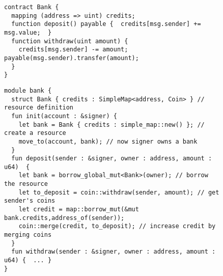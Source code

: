 \begin{figure}[t]
\small
\begin{lstlisting}[language=solidity,caption={Simplified Solidity code for the Bank case study},label={fig:codeSol}]
contract Bank { 
  mapping (address => uint) credits;
  function deposit() payable {  credits[msg.sender] += msg.value;  }
  function withdraw(uint amount) {
    credits[msg.sender] -= amount; payable(msg.sender).transfer(amount);
  }
}
\end{lstlisting}
\end{figure}

\begin{figure}[t]
\begin{lstlisting}[language=move,caption={Simplified Move code for the Bank case study},label={fig:codeMove}]
module bank {
  struct Bank { credits : SimpleMap<address, Coin> } //  resource definition 
  fun init(account : &signer) {
    let bank = Bank { credits : simple_map::new() }; // create a resource 
    move_to(account, bank); // now signer owns a bank
  }
  fun deposit(sender : &signer, owner : address, amount : u64)  {
    let bank = borrow_global_mut<Bank>(owner); // borrow the resource        
    let to_deposit = coin::withdraw(sender, amount); // get sender's coins
    let credit = map::borrow_mut(&mut bank.credits,address_of(sender)); 
    coin::merge(credit, to_deposit); // increase credit by merging coins   
  }
  fun withdraw(sender : &signer, owner : address, amount : u64) {  ... }
}
\end{lstlisting}
\end{figure}


